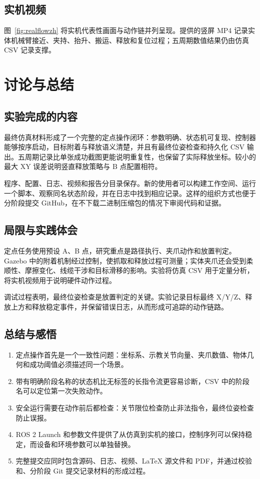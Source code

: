 \documentclass[UTF8,11pt,a4paper]{ctexart}
\begin{document}
\subsection{实机视频}
图~\ref{fig:realflowzh} 将实机代表性画面与动作链并列呈现。提供的竖屏 MP4 记录实体机械臂接近、夹持、抬升、搬运、释放和复位过程；五周期数值结果仍由仿真 CSV 记录支撑。

\section{讨论与总结}
\subsection{实验完成的内容}
最终仿真材料形成了一个完整的定点操作闭环：参数明确、状态机可复现、控制器能够按序启动，目标附着与释放语义清楚，并且有最终位姿检查和持久化 CSV 输出。五周期记录比单张成功截图更能说明重复性，也保留了实际释放坐标。较小的最大 XY 误差说明竖直释放策略与 B 点配置相符。

程序、配置、日志、视频和报告分目录保存。新的使用者可以构建工作空间、运行一个脚本、观察同名状态阶段，并在日志中找到相应记录。这样的组织方式也便于分阶段提交 GitHub，在不下载二进制压缩包的情况下审阅代码和证据。
\subsection{局限与实践体会}
定点任务使用预设 A、B 点，研究重点是路径执行、夹爪动作和放置判定。Gazebo 中的附着机制经过控制，使抓取和释放过程可测量；实体夹爪还会受到柔顺性、摩擦变化、线缆干涉和目标滑移的影响。实验将仿真 CSV 用于定量分析，将实机视频用于说明硬件动作过程。

调试过程表明，最终位姿检查是放置判定的关键。实验记录目标最终 X/Y/Z、释放上方和释放稳定事件，并保留错误日志，从而形成可追踪的动作链路。
\subsection{总结与感悟}
\begin{enumerate}\item 定点操作首先是一个一致性问题：坐标系、示教关节向量、夹爪数值、物体几何和成功阈值必须描述同一个场景。\item 带有明确阶段名称的状态机比无标签的长指令流更容易诊断，CSV 中的阶段名可以定位第一次失败动作。\item 安全运行需要在动作前后都检查：关节限位检查防止非法指令，最终位姿检查防止误报。\item ROS 2 Launch 和参数文件提供了从仿真到实机的接口，控制序列可以保持稳定，而设备和环境参数可以单独替换。\item 完整提交应同时包含源码、日志、视频、LaTeX 源文件和 PDF，并通过校验和、分阶段 Git 提交记录材料的形成过程。\end{enumerate}
\end{document}
